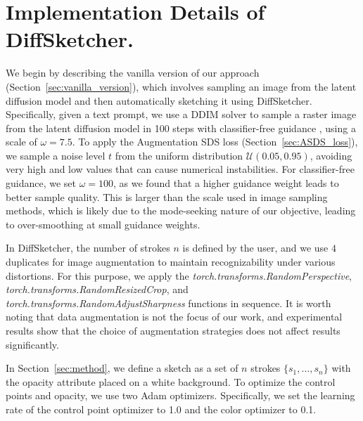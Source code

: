 \documentclass{article}
\begin{document}
\section{Implementation Details of DiffSketcher.}
\label{supp:implement}
We begin by describing the vanilla version of our approach (Section~\ref{sec:vanilla_version}), which involves sampling an image from the latent diffusion model \cite{ldm_2022_Rombach} and then automatically sketching it using DiffSketcher. Specifically, given a text prompt, we use a DDIM solver \cite{ddim_song_2021} to sample a raster image from the latent diffusion model in 100 steps with classifier-free guidance \cite{classifierfree_2022_ho}, using a scale of $\omega = 7.5$. To apply the Augmentation SDS loss (Section~\ref{sec:ASDS_loss}), we sample a noise level $t$ from the uniform distribution $\mathcal{U}(0.05, 0.95)$, avoiding very high and low values that can cause numerical instabilities. For classifier-free guidance, we set $\omega = 100$, as we found that a higher guidance weight leads to better sample quality. This is larger than the scale used in image sampling methods, which is likely due to the mode-seeking nature of our objective, leading to over-smoothing at small guidance weights.

In DiffSketcher, the number of strokes $n$ is defined by the user, and we use $4$ duplicates for image augmentation to maintain recognizability under various distortions. For this purpose, we apply the \textit{torch.transforms.RandomPerspective}, \textit{torch.transforms.RandomResizedCrop}, and \textit{torch.transforms.RandomAdjustSharpness} functions in sequence. It is worth noting that data augmentation is not the focus of our work, and experimental results show that the choice of augmentation strategies does not affect results significantly.

In Section~\ref{sec:method}, we define a sketch as a set of $n$ strokes $\{s_1, \dots, s_n\}$ with the opacity attribute placed on a white background. To optimize the control points and opacity, we use two Adam optimizers. Specifically, we set the learning rate of the control point optimizer to 1.0 and the color optimizer to 0.1.
\end{document}
